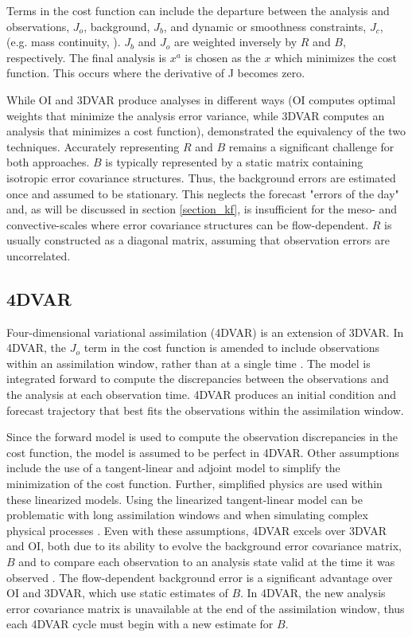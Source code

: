 Terms in the cost function can include the departure between the analysis and observations, \(J_o\), background, \(J_b\), and dynamic or smoothness constraints, \(J_c\), (e.g. mass continuity, \citealt{gaoetal03}). \(J_b\) and \(J_o\) are weighted inversely by \(R\) and \(B\), respectively. The final analysis is  \(x^a\) is chosen as the \(x\) which minimizes the cost function. This occurs where the derivative of J becomes zero.

While OI and 3DVAR produce analyses in different ways (OI computes optimal weights that minimize the analysis error variance, while 3DVAR computes an analysis that minimizes a cost function), \citet{lorenc86} demonstrated the equivalency of the two techniques. Accurately representing \(R\) and \(B\) remains a significant challenge for both approaches. \(B\) is typically represented by a static matrix containing isotropic error covariance structures. Thus, the background errors are estimated once and assumed to be stationary. This neglects the forecast "errors of the day" and, as will be discussed in section \ref{section_kf}, is insufficient for the meso- and convective-scales where error covariance structures can be flow-dependent.  \(R\) is usually constructed as a diagonal matrix, assuming that observation errors are uncorrelated.

\subsection{4DVAR}
Four-dimensional variational assimilation (4DVAR) is an extension of 3DVAR. In 4DVAR, the \(J_o\) term in the cost function is amended to include observations within an assimilation window, rather than at a single time \citep{talagrandcourtier87}. The model is integrated forward to compute the discrepancies between the observations and the analysis at each observation time. 4DVAR produces an initial condition and forecast trajectory that best fits the observations within the assimilation window.

Since the forward model is used to compute the observation discrepancies in the cost function, the model is assumed to be perfect in 4DVAR. Other assumptions include the use of a tangent-linear and adjoint model to simplify the minimization of the cost function. Further, simplified physics are used within these linearized models. Using the linearized tangent-linear model can be problematic with long assimilation windows and when simulating complex physical processes \citep{tremolet04}.  Even with these assumptions, 4DVAR excels over 3DVAR and OI, both due to its ability to evolve the background error covariance matrix, \(B\) and to compare each observation to an analysis state valid at the time it was observed \citep{lorenc05}. The flow-dependent background error is a significant advantage over OI and 3DVAR, which use static estimates of \(B\). In 4DVAR, the new analysis error covariance matrix is unavailable at the end of the assimilation window, thus each 4DVAR cycle must begin with a new estimate for \(B\).

